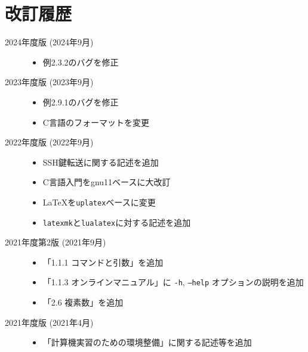\section*{改訂履歴}

\noindent
\begin{description}
    \item [2024年度版 (2024年9月)] \mbox{}

       \begin{itemize}
           \item 例2.3.2のバグを修正
       \end{itemize}


    \item [2023年度版 (2023年9月)] \mbox{}

       \begin{itemize}
           \item 例2.9.1のバグを修正
           \item C言語のフォーマットを変更
       \end{itemize}


    \item [2022年度版 (2022年9月)] \mbox{}

          \begin{itemize}
              \item SSH鍵転送に関する記述を追加
              \item C言語入門をgnu11ベースに大改訂
              \item \LaTeX を\texttt{uplatex}ベースに変更
              \item \texttt{latexmk}と\texttt{lualatex}に対する記述を追加
          \end{itemize}

    \item[2021年度第2版 (2021年9月)] \mbox{}

          \begin{itemize}
              \item 「1.1.1 コマンドと引数」を追加
              \item 「1.1.3 オンラインマニュアル」に \texttt{-h}, \texttt{--help} オプションの説明を追加
              \item 「2.6 複素数」を追加
          \end{itemize}

    \item[2021年度版 (2021年4月)] \mbox{}

          \begin{itemize}
              \item 「計算機実習のための環境整備」に関する記述等を追加
          \end{itemize}


\end{description}
